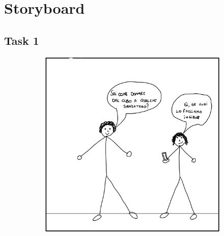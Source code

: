 \documentclass{article}
\begin{document}
\clearpage
\section{Storyboard}

\subsection{Task 1}
\begin{figure}[H]
    \centering
    \begin{subfigure}{0.25\textwidth}
        \centering
        \includegraphics[width=\textwidth]{Storyboard/task1-img/t1.1.png}
    \end{subfigure}
    \hspace{0.02\textwidth}
    \begin{subfigure}{0.25\textwidth}
        \centering

\end{subfigure}
\end{figure}
\end{document}
